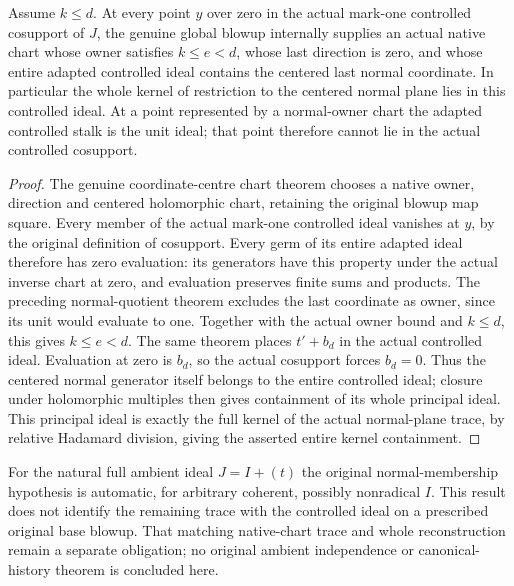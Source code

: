 \begin{theorem}
\label{hir:disjoint-controlled-normal-pivot-exclusion}
\leanok
Assume $k\le d$. At every point $y$ over zero in the actual mark-one controlled
cosupport of $J$, the genuine global blowup internally supplies an actual
native chart whose owner satisfies $k\le e<d$, whose last direction is zero,
and whose entire adapted controlled ideal contains the centered last normal
coordinate. In particular the whole kernel of restriction to the centered normal plane
lies in this controlled ideal. At a point represented by a normal-owner chart the adapted controlled
stalk is the unit ideal; that point therefore cannot lie in the actual
controlled cosupport.
\end{theorem}
\begin{proof}
The genuine coordinate-centre chart theorem chooses a native owner, direction
and centered holomorphic chart, retaining the original blowup map square.
Every member of the actual mark-one controlled ideal vanishes at $y$, by the
original definition of cosupport. Every germ of its entire adapted ideal
therefore has zero evaluation: its generators have this property under the
actual inverse chart at zero, and evaluation preserves finite sums and
products. The preceding normal-quotient theorem excludes the last coordinate
as owner, since its unit would evaluate to one. Together with the actual
owner bound and $k\le d$, this gives $k\le e<d$. The same theorem places
$t'+b_d$ in the actual controlled ideal. Evaluation at zero is $b_d$, so the
actual cosupport forces $b_d=0$. Thus the centered normal generator itself
belongs to the entire controlled ideal; closure under holomorphic multiples
then gives containment of its whole principal ideal. This principal ideal
is exactly the full kernel of the actual normal-plane trace, by relative
Hadamard division, giving the asserted entire kernel containment.
\end{proof}

\begin{remark}
For the natural full ambient ideal $J=I+(t)$ the original normal-membership
hypothesis is automatic, for arbitrary coherent, possibly nonradical $I$.
This result does not identify the remaining trace with the controlled ideal
on a prescribed original base blowup. That matching native-chart trace and
whole reconstruction remain a separate obligation; no original ambient
independence or canonical-history theorem is concluded here.
\end{remark}
